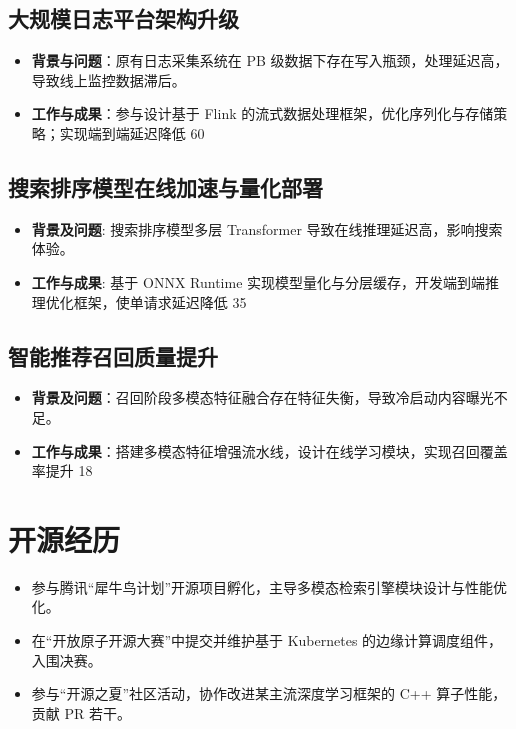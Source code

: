 \documentclass{resume}
\begin{document}
\subsection{大规模日志平台架构升级}
\begin{itemize}
  \item \textbf{背景与问题}：原有日志采集系统在 PB 级数据下存在写入瓶颈，处理延迟高，导致线上监控数据滞后。
  \item \textbf{工作与成果}：参与设计基于 Flink 的流式数据处理框架，优化序列化与存储策略；实现端到端延迟降低 60%
\end{itemize}

\subsection{搜索排序模型在线加速与量化部署}
\begin{itemize}
  \item \textbf{背景及问题}: 搜索排序模型多层 Transformer 导致在线推理延迟高，影响搜索体验。
  \item \textbf{工作与成果}: 基于 ONNX Runtime 实现模型量化与分层缓存，开发端到端推理优化框架，使单请求延迟降低 35%
\end{itemize}
\subsection{智能推荐召回质量提升}
\begin{itemize}
  \item \textbf{背景及问题}：召回阶段多模态特征融合存在特征失衡，导致冷启动内容曝光不足。
  \item \textbf{工作与成果}：搭建多模态特征增强流水线，设计在线学习模块，实现召回覆盖率提升 18%
\end{itemize}

\section{\faGithub \kaishu 开源经历}
\begin{itemize}
  \item 参与腾讯“犀牛鸟计划”开源项目孵化，主导多模态检索引擎模块设计与性能优化。
  \item 在“开放原子开源大赛”中提交并维护基于 Kubernetes 的边缘计算调度组件，入围决赛。
  \item 参与“开源之夏”社区活动，协作改进某主流深度学习框架的 C++ 算子性能，贡献 PR 若干。
\end{itemize}
\end{document}
